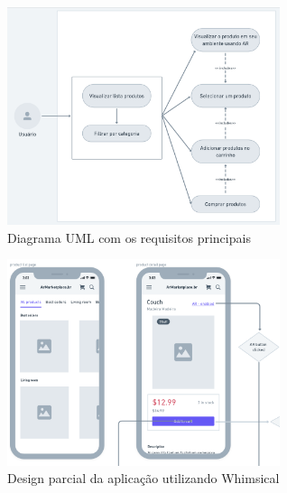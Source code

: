 \documentclass[conference]{IEEEtran}
\begin{document}
\begin{figure}[h]
  \caption{Diagrama UML com os requisitos principais}

  \centering %
  \includegraphics[width=8cm]{assets/user_uml_diagram.png}
\end{figure}

\begin{figure}[h]
  \caption{Design parcial da aplicação utilizando Whimsical}

  \centering %
  \includegraphics[width=8cm]{assets/design.png}
\end{figure}
\end{document}
